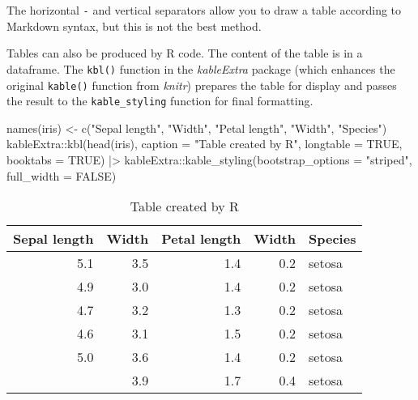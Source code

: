 \documentclass[fleqn,10pt]{latex/stylish_article} %
\newenvironment{Shaded}{\begin{snugshade}}{\end{snugshade}}
\newcommand{\ConstantTok}[1]{\textcolor[rgb]{0.00,0.00,0.00}{{#1}}}
\newcommand{\SpecialCharTok}[1]{\textcolor[rgb]{0.00,0.00,0.00}{{#1}}}
\newcommand{\StringTok}[1]{\textcolor[rgb]{0.31,0.60,0.02}{{#1}}}
\newcommand{\OtherTok}[1]{\textcolor[rgb]{0.56,0.35,0.01}{{#1}}}
\newcommand{\FunctionTok}[1]{\textcolor[rgb]{0.00,0.00,0.00}{{#1}}}
\newcommand{\AttributeTok}[1]{\textcolor[rgb]{0.77,0.63,0.00}{{#1}}}
\newcommand{\NormalTok}[1]{{#1}}
\begin{document}
The horizontal \texttt{-} and vertical separators \texttt{\textbar{}} allow you to draw a table according to Markdown syntax, but this is not the best method.

Tables can also be produced by R code.
The content of the table is in a dataframe.
The \texttt{kbl()} function in the \emph{kableExtra} package (which enhances the original \texttt{kable()} function from \emph{knitr}) prepares the table for display and passes the result to the \texttt{kable\_styling} function for final formatting.

\scriptsize

\begin{Shaded}
\begin{Highlighting}[]
\FunctionTok{names}\NormalTok{(iris) }\OtherTok{\textless{}{-}} \FunctionTok{c}\NormalTok{(}\StringTok{"Sepal length"}\NormalTok{, }\StringTok{"Width"}\NormalTok{, }\StringTok{"Petal length"}\NormalTok{,}
    \StringTok{"Width"}\NormalTok{, }\StringTok{"Species"}\NormalTok{)}
\NormalTok{kableExtra}\SpecialCharTok{::}\FunctionTok{kbl}\NormalTok{(}\FunctionTok{head}\NormalTok{(iris), }\AttributeTok{caption =} \StringTok{"Table created by R"}\NormalTok{,}
    \AttributeTok{longtable =} \ConstantTok{TRUE}\NormalTok{, }\AttributeTok{booktabs =} \ConstantTok{TRUE}\NormalTok{) }\SpecialCharTok{|\textgreater{}}
\NormalTok{    kableExtra}\SpecialCharTok{::}\FunctionTok{kable\_styling}\NormalTok{(}\AttributeTok{bootstrap\_options =} \StringTok{"striped"}\NormalTok{,}
        \AttributeTok{full\_width =} \ConstantTok{FALSE}\NormalTok{)}
\end{Highlighting}
\end{Shaded}

\begin{longtable}[t]{rrrrl}
\caption{\label{tab:kable}Table created by R}\\
\toprule
Sepal length & Width & Petal length & Width & Species\\
\midrule
5.1 & 3.5 & 1.4 & 0.2 & setosa\\
4.9 & 3.0 & 1.4 & 0.2 & setosa\\
4.7 & 3.2 & 1.3 & 0.2 & setosa\\
4.6 & 3.1 & 1.5 & 0.2 & setosa\\
5.0 & 3.6 & 1.4 & 0.2 & setosa\\
\addlinespace
5.4 & 3.9 & 1.7 & 0.4 & setosa\\
\bottomrule
\end{longtable}

\normalsize
\end{document}
